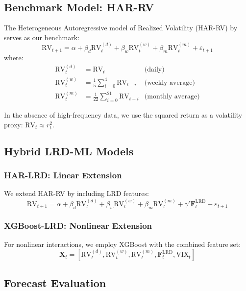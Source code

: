 \documentclass[12pt,a4paper]{article}
\newcommand{\RV}{\text{RV}}
\newcommand{\VIX}{\text{VIX}}
\begin{document}
\subsection{Benchmark Model: HAR-RV}

The Heterogeneous Autoregressive model of Realized Volatility (HAR-RV) by \citet{corsi2009simple} serves as our benchmark:
\begin{equation}
    \RV_{t+1} = \alpha + \beta_d \RV_t^{(d)} + \beta_w \RV_t^{(w)} + \beta_m \RV_t^{(m)} + \varepsilon_{t+1}
\end{equation}
where:
\begin{align}
    \RV_t^{(d)} &= \RV_t & \text{(daily)} \\
    \RV_t^{(w)} &= \frac{1}{5}\sum_{i=0}^{4} \RV_{t-i} & \text{(weekly average)} \\
    \RV_t^{(m)} &= \frac{1}{22}\sum_{i=0}^{21} \RV_{t-i} & \text{(monthly average)}
\end{align}

In the absence of high-frequency data, we use the squared return as a volatility proxy: $\RV_t \approx r_t^2$.

\subsection{Hybrid LRD-ML Models}

\subsubsection{HAR-LRD: Linear Extension}

We extend HAR-RV by including LRD features:
\begin{equation}
    \RV_{t+1} = \alpha + \beta_d \RV_t^{(d)} + \beta_w \RV_t^{(w)} + \beta_m \RV_t^{(m)} + \gamma' \mathbf{F}_t^{\text{LRD}} + \varepsilon_{t+1}
\end{equation}

\subsubsection{XGBoost-LRD: Nonlinear Extension}

For nonlinear interactions, we employ XGBoost \citep{chen2016xgboost} with the combined feature set:
\begin{equation}
    \mathbf{X}_t = [\RV_t^{(d)}, \RV_t^{(w)}, \RV_t^{(m)}, \mathbf{F}_t^{\text{LRD}}, \VIX_t]
\end{equation}

\subsection{Forecast Evaluation}
\end{document}
